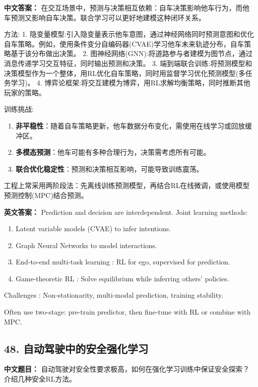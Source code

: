 \documentclass[10pt,a4paper]{ctexart}
\begin{document}
\textbf{中文答案：}  
在交互场景中，预测与决策相互依赖：自车决策影响他车行为，而他车预测又影响自车决策。联合学习可以更好地建模这种闭环关系。

 方法:
1.  隐变量模型:引入隐变量表示他车意图，通过神经网络同时预测意图和优化自车策略。例如，使用条件变分自编码器(CVAE)学习他车未来轨迹分布，自车策略基于该分布做出决策。
2.  图神经网络(GNN):将道路参与者建模为图节点，通过消息传递学习交互特征，同时输出预测和决策。
3.  端到端联合训练:将预测模型和决策模型作为一个整体，用RL优化自车策略，同时用监督学习优化预测模型(多任务学习)。
4.  博弈论框架:将交互建模为博弈，用RL求解均衡策略，同时推断其他玩家的策略。

 训练挑战:
\begin{enumerate}
    \item \textbf{非平稳性}：随着自车策略更新，他车数据分布变化，需使用在线学习或回放缓冲区。
    \item \textbf{多模态预测}：他车可能有多种合理行为，决策需考虑所有可能。
    \item \textbf{联合优化稳定性}：预测和决策相互影响，可能导致训练震荡。
\end{enumerate}

工程上常采用两阶段法：先离线训练预测模型，再结合RL在线微调，或使用模型预测控制(MPC)结合预测。

\textbf{英文答案：}  
Prediction and decision are interdependent. Joint learning methods:
\begin{enumerate}
    \item Latent variable models  (CVAE) to infer intentions.
    \item Graph Neural Networks  to model interactions.
    \item End-to-end multi-task learning : RL for ego, supervised for prediction.
    \item Game-theoretic RL : Solve equilibrium while inferring others' policies.
\end{enumerate}

 Challenges : Non-stationarity, multi-modal prediction, training stability.

Often use two-stage: pre-train predictor, then fine-tune with RL or combine with MPC.

\subsection*{48. 自动驾驶中的安全强化学习}
\textbf{中文题目：} 自动驾驶对安全性要求极高，如何在强化学习训练中保证安全探索？介绍几种安全RL方法。
\end{document}
